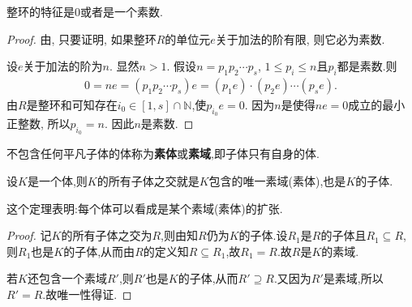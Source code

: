 \documentclass[../../main.tex]{subfiles}%
\begin{document}
\begin{theorem}
整环的特征是0或者是一个素数.
\end{theorem}
\begin{proof}
由, 只要证明, 如果整环$R$的单位元$e$关于加法的阶有限, 则它必为素数.

设$e$关于加法的阶为$n$. 显然$n > 1$. 假设$n = p_1p_2\cdots p_s$, $1 \leqslant p_i \leqslant n$且$p_i$都是素数.则
\begin{align*}
0=ne=(p_1p_2\cdots p_s)e=\left( p_1e \right) \cdot \left( p_2e \right) \cdots \left( p_se \right) .
\end{align*}
由$R$是整环和可知存在$i_0\in [1,s]\cap \mathbb{N}$,使$p_{i_0}e=0$. 因为$n$是使得$ne = 0$成立的最小正整数, 所以$p_{i_0} = n$. 因此$n$是素数.
\end{proof}

\begin{definition}[素域/素体]
不包含任何平凡子体的体称为\textbf{素体}或\textbf{素域},即子体只有自身的体.
\end{definition}

\begin{theorem}\label{theorem:每个体必包含唯一的一个素体为其子体}
设$K$是一个体,则$K$的所有子体之交就是$K$包含的唯一素域(素体),也是$K$的子体.
\end{theorem}
\begin{remark}
这个定理表明:每个体可以看成是某个素域(素体)的扩张.
\end{remark}
\begin{proof}
记$K$的所有子体之交为$R$,则由知$R$仍为$K$的子体.设$R_1$是$R$的子体且$R_1\subseteq R$,则$R_1$也是$K$的子体,从而由$R$的定义知$R\subseteq R_1$,故$R_1=R$.故$R$是$K$的素域.

若$K$还包含一个素域$R'$,则$R'$也是$K$的子体,从而$R'\supseteq R$.又因为$R'$是素域,所以$R'=R$.故唯一性得证.
\end{proof}
\end{document}
